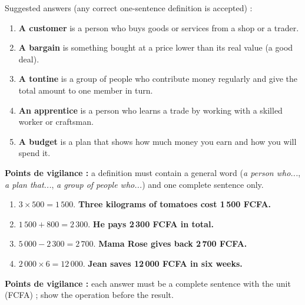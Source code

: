 \documentclass[11pt]{article}
\begin{document}
\begin{corrige}
Suggested answers (any correct one-sentence definition is accepted) :
\begin{enumerate}
\item \textbf{A customer} is a person who buys goods or services from a shop or a trader.
\item \textbf{A bargain} is something bought at a price lower than its real value (a good deal).
\item \textbf{A tontine} is a group of people who contribute money regularly and give the total amount to one member in turn.
\item \textbf{An apprentice} is a person who learns a trade by working with a skilled worker or craftsman.
\item \textbf{A budget} is a plan that shows how much money you earn and how you will spend it.
\end{enumerate}
\textbf{Points de vigilance :} a definition must contain a general word (\emph{a person who...}, \emph{a plan that...}, \emph{a group of people who...}) and one complete sentence only.
\end{corrige}

\begin{corrige}
\begin{enumerate}
\item $3 \times 500 = 1\,500$. \textbf{Three kilograms of tomatoes cost 1\,500 FCFA.}
\item $1\,500 + 800 = 2\,300$. \textbf{He pays 2\,300 FCFA in total.}
\item $5\,000 - 2\,300 = 2\,700$. \textbf{Mama Rose gives back 2\,700 FCFA.}
\item $2\,000 \times 6 = 12\,000$. \textbf{Jean saves 12\,000 FCFA in six weeks.}
\end{enumerate}
\textbf{Points de vigilance :} each answer must be a complete sentence with the unit (FCFA) ; show the operation before the result.
\end{corrige}
\end{document}

